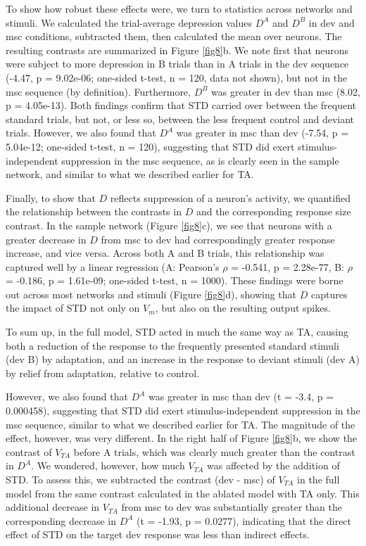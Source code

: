 \documentclass[pdflatex,referee,iicol,sn-basic]{sn-jnl}
\theoremstyle{thmstyleone}%
\theoremstyle{thmstyletwo}%
\theoremstyle{thmstylethree}%
\begin{document}
To show how robust these effects were, we turn to statistics across networks and stimuli. We calculated the trial-average depression values $D^A$ and $D^B$ in dev and msc conditions, subtracted them, then calculated the mean over neurons. The resulting contrasts are summarized in Figure \ref{fig8}b. We note first that neurons were subject to more depression in B trials than in A trials in the dev sequence (-4.47, p = 9.02e-06; one-sided t-test, n = 120, data not shown), but not in the msc sequence (by definition). Furthermore, $D^B$ was greater in dev than msc (8.02, p = 4.05e-13). Both findings confirm that STD carried over between the frequent standard trials, but not, or less so, between the less frequent control and deviant trials.
However, we also found that $D^A$ was greater in msc than dev (-7.54, p = 5.04e-12; one-sided t-test, n = 120), suggesting that STD did exert stimulus-independent suppression in the msc sequence, as is clearly seen in the sample network, and similar to what we described earlier for TA.

Finally, to show that $D$ reflects suppression of a neuron's activity, we quantified the relationship between the contrasts in $D$ and the corresponding response size contrast. In the sample network (Figure \ref{fig8}c), we see that neurons with a greater decrease in $D$ from msc to dev had correspondingly greater response increase, and vice versa. Across both A and B trials, this relationship was captured well by a linear regression (A: Pearson's $\rho$ = -0.541, p = 2.28e-77, B: $\rho$ = -0.186, p = 1.61e-09; one-sided t-test, n = 1000). These findings were borne out across most networks and stimuli (Figure \ref{fig8}d), showing that $D$ captures the impact of STD not only on $V_m$, but also on the resulting output spikes.

To sum up, in the full model, STD acted in much the same way as TA, causing both a reduction of the response to the frequently presented standard stimuli (dev B) by adaptation, and an increase in the response to deviant stimuli (dev A) by relief from adaptation, relative to control. %

However, we also found that $D^A$ was greater in msc than dev (t = -3.4, p = 0.000458), suggesting that STD did exert stimulus-independent suppression in the msc sequence, similar to what we described earlier for TA. The magnitude of the effect, however, was very different. In the right half of Figure \ref{fig8}b, we show the contrast of $V_{TA}$ before A trials, which was clearly much greater than the contrast in $D^A$. We wondered, however, how much $V_{TA}$ was affected by the addition of STD. To assess this, we subtracted the contrast (dev - msc) of $V_{TA}$ in the full model from the same contrast calculated in the ablated model with TA only. This additional decrease in $V_{TA}$ from msc to dev was substantially greater than the corresponding decrease in $D^A$ (t = -1.93, p = 0.0277), indicating that the direct effect of STD on the target dev response was less than indirect effects.
\end{document}
